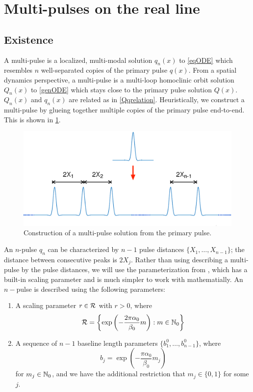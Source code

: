 \documentclass[thesis.tex]{subfiles}
\begin{document}
\section{Multi-pulses on the real line}\label{sec:multiR}

\subsection{Existence}\label{sec:multiexistR}

A multi-pulse is a localized, multi-modal solution $q_n(x)$ to \cref{eqODE} which resembles $n$ well-separated copies of the primary pulse $q(x)$. From a spatial dynamics perspective, a multi-pulse is a multi-loop homoclinic orbit solution $Q_n(x)$ to \eqref{genODE} which stays close to the primary pulse solution $Q(x)$. $Q_n(x)$ and $q_n(x)$ are related as in \cref{Qqrelation}. Heuristically, we construct a multi-pulse by glueing together multiple copies of the primary pulse end-to-end. This is shown in \cref{fig:multipulsediag}.

\begin{figure}[H]
\includegraphics[width=12cm]{images/kdv5numerics/multipulse.eps}
\caption{Construction of a multi-pulse solution from the primary pulse.}
\label{fig:multipulsediag}
\end{figure}

An $n$-pulse $q_n$ can be characterized by $n-1$ pulse distances $\{ X_1, \dots, X_{n-1} \}$; the distance between consecutive peaks is $2 X_j$. Rather than using describing a multi-pulse by the pulse distances, we will use the parameterization from \cite{SandstedeStrut}, which has a built-in scaling parameter and is much simpler to work with mathematially. An $n-$pulse is described using the following parameters:
\begin{enumerate}
\item A scaling parameter $r \in \mathcal{R}$ with $r > 0$, where
\[
\mathcal{R} = \left\{ \mathop\mathrm{exp}\nolimits\left(-\frac{2 \pi \alpha_0}{\beta_0}m \right) : m \in \mathbb{N}_0 \right\}
\]
\item A sequence of $n-1$ baseline length parameters $\{ b_1^0, \dots, b_{n-1}^0 \}$, where 
\[
b_j = \exp\left(-\frac{\pi \alpha_0}{\beta_0}m_j \right)
\]
for $m_j \in \mathbb{N}_0$, and we have the additional restriction that $m_j \in \{0, 1\}$ for some $j$.
\end{enumerate}
\end{document}

